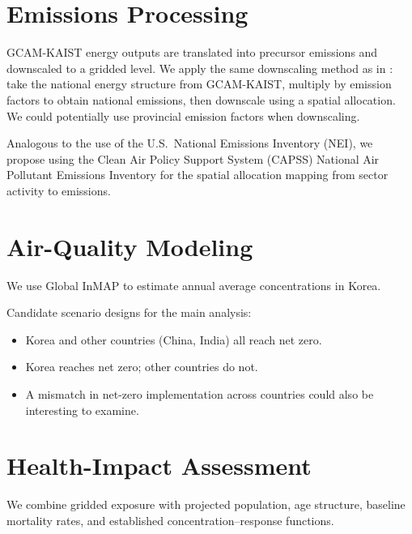 \section{Emissions Processing}\label{sec:emissions}

GCAM-KAIST energy outputs are translated into precursor emissions and
downscaled to a gridded level. We apply the same downscaling method as in
: take the national energy structure from
GCAM-KAIST, multiply by emission factors to obtain national emissions, then
downscale using a spatial allocation. We could potentially use provincial
emission factors when downscaling.

Analogous to the use of the U.S.\ National Emissions Inventory (NEI), we
propose using the Clean Air Policy Support System (CAPSS) National Air
Pollutant Emissions Inventory for the spatial allocation mapping from sector
activity to emissions.


\section{Air-Quality Modeling}\label{sec:aq}

We use Global InMAP to estimate annual average \PM{} concentrations in Korea.


Candidate scenario designs for the main analysis:
\begin{itemize}
  \item Korea and other countries (China, India) all reach net zero.
  \item Korea reaches net zero; other countries do not.
  \item A mismatch in net-zero implementation across countries could also be
        interesting to examine.
\end{itemize}

\section{Health-Impact Assessment}\label{sec:hia}

We combine gridded \PM{} exposure with projected population, age structure,
baseline mortality rates, and established concentration--response functions.
